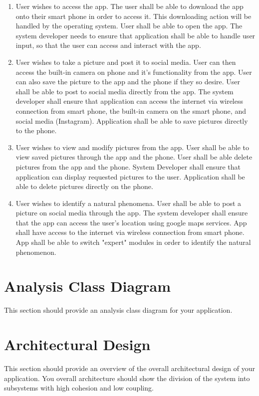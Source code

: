 \documentclass[]{article}
\begin{document}
\begin{enumerate}
	\item User wishes to access the app.  The user shall be able to download the app onto their smart phone in order to access it.  This downloading action will be handled by the operating system.  User shall be able to open the app.  The system developer needs to ensure that application shall be able to handle user input, so that the user can access and interact with the app.
	\item User wishes to take a picture and post it to social media.  User can then access the built-in camera on phone and it's functionality from the app.  User can also save the picture to the app and the phone if they so desire.  User shall be able to post to social media directly from the app.  The system developer shall ensure that application can access the internet via wireless connection from smart phone, the built-in camera on the smart phone, and social media (Instagram).  Application shall be able to save pictures directly to the phone.
	\item User wishes to view and modify pictures from the app.  User shall be able to view saved pictures through the app and the phone.  User shall be able delete pictures from the app and the phone.  System Developer shall ensure that application can display requested pictures to the user.  Application shall be able to delete pictures directly on the phone.
	\item User wishes to identify a natural phenomena. User shall be able to post a picture on social media through the app.  The system developer shall ensure that the app can access the user's location using google maps services. App shall have access to the internet via wireless connection from smart phone. App shall be able to switch "expert" modules in order to identify the natural phenomenon. 
\end{enumerate}

\section{Analysis Class Diagram}
\label{sec:analysis_class_diagram}
This section should provide an analysis class diagram for your application.


\section{Architectural Design}
\label{sec:architectural_design}
This section should provide an overview of the overall architectural design of your application. You overall architecture should show the division of the system into subsystems with high cohesion and low coupling.
\end{document}
